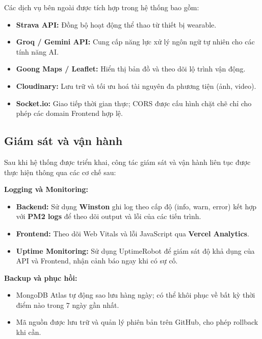 Các dịch vụ bên ngoài được tích hợp trong hệ thống bao gồm:

\begin{itemize}
    \item \textbf{Strava API:} Đồng bộ hoạt động thể thao từ thiết bị wearable.
    \item \textbf{Groq / Gemini API:} Cung cấp năng lực xử lý ngôn ngữ tự nhiên cho các tính năng AI.
    \item \textbf{Goong Maps / Leaflet:} Hiển thị bản đồ và theo dõi lộ trình vận động.
    \item \textbf{Cloudinary:} Lưu trữ và tối ưu hoá tài nguyên đa phương tiện (ảnh, video).
    \item \textbf{Socket.io:} Giao tiếp thời gian thực; CORS được cấu hình chặt chẽ chỉ cho phép các domain Frontend hợp lệ.
\end{itemize}

\subsection{Giám sát và vận hành}
\label{subsec:deploy_monitoring}

Sau khi hệ thống được triển khai, công tác giám sát và vận hành liên tục được thực hiện thông qua các cơ chế sau:

\textbf{Logging và Monitoring:}
\begin{itemize}
    \item \textbf{Backend:} Sử dụng \textbf{Winston} ghi log theo cấp độ (info, warn, error) kết hợp với \textbf{PM2 logs} để theo dõi output và lỗi của các tiến trình.
    \item \textbf{Frontend:} Theo dõi Web Vitals và lỗi JavaScript qua \textbf{Vercel Analytics}.
    \item \textbf{Uptime Monitoring:} Sử dụng UptimeRobot để giám sát độ khả dụng của API và Frontend, nhận cảnh báo ngay khi có sự cố.
\end{itemize}

\textbf{Backup và phục hồi:}
\begin{itemize}
    \item MongoDB Atlas tự động sao lưu hàng ngày; có thể khôi phục về bất kỳ thời điểm nào trong 7 ngày gần nhất.
    \item Mã nguồn được lưu trữ và quản lý phiên bản trên GitHub, cho phép rollback khi cần.
\end{itemize}

